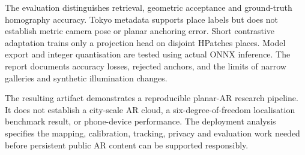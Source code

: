 The evaluation distinguishes retrieval, geometric acceptance and ground-truth homography accuracy.
Tokyo metadata supports place labels but does not establish metric camera pose or planar anchoring
error. Short contrastive adaptation trains only a projection head on disjoint HPatches places.
Model export and integer quantisation are tested using actual ONNX inference. The report documents
accuracy losses, rejected anchors, and the limits of narrow galleries and synthetic illumination changes.

The resulting artifact demonstrates a reproducible planar-AR research pipeline. It does not
establish a city-scale AR cloud, a six-degree-of-freedom localisation benchmark result, or phone-device
performance. The deployment analysis specifies the mapping, calibration, tracking, privacy and
evaluation work needed before persistent public AR content can be supported responsibly.
\clearpage
